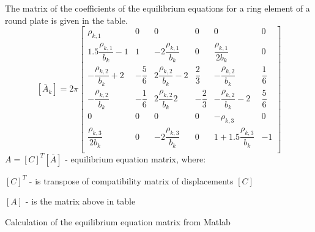 The matrix of the coefficients of the equilibrium equations for a ring element of a round plate is
given in the table.
  \begin{equation}\label{eqn:eqMatrix}
    [\overline{A}_k]=2\pi
    \begin{bmatrix}
        \rho_{k,1} & 0 & 0 & 0 & 0 & 0 \\[2ex]
        1.5\dfrac{\rho_{k,1}}{b_k}-1 & 1 & -2\dfrac{\rho_{k,1}}{b_k} & 0 & \dfrac{\rho_{k,1}}{2b_k} & 0 \\[2ex]
        -\dfrac{\rho_{k,2}}{b_k}+2 & -\dfrac{5}{6} & 2\dfrac{\rho_{k,2}}{b_k}-2 & \dfrac{2}{3} & -\dfrac{\rho_{k,2}}{b_k} & \dfrac{1}{6} \\[2ex]
        -\dfrac{\rho_{k,2}}{b_k} & -\dfrac{1}{6} & 2\dfrac{\rho_{k,2}}{b_k}2 & -\dfrac{2}{3} & -\dfrac{\rho_{k,2}}{b_k}-2 & \dfrac{5}{6} \\[2ex]
        0 & 0 & 0 & 0 & -\rho_{k,3} & 0 \\[2ex]
        \dfrac{\rho_{k,3}}{2b_k} & 0 & -2\dfrac{\rho_{k,3}}{b_k} & 0 & 1+1.5\dfrac{\rho_{k,3}}{b_k} & -1 \\[2ex]
      \end{bmatrix}
  \end{equation}
$A=[C]^T[\overline{A}]$ - equilibrium equation matrix, where:\par
$[C]^T$ - is transpose of compatibility matrix of displacements $[C]$\par
$[A]$ - is the matrix above in table\par
\smallskip
Calculation of the equilibrium equation matrix from Matlab\par
{}